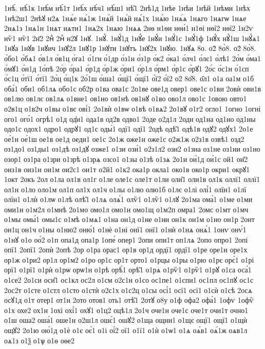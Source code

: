 {1нѣ́.
нѣ́1к
1нѣ́м
нѣ́1т
1нѣ́х
нѣ́ч1
нѣ́ш1
нѣ̑1
2нѣ1д
1нѣе
1нѣи
1нѣй
1нѣми
1нѣх
1нѣ2ш1
2нѣꙋ
н2ѧ
1нѧ́е
нѧ́1ж
1нѧ́й
1нѧ́й
нѧ́1х
1нѧ́ю
1нѧ́ѧ
1нѧго
1нѧгѡ
1нѧе
2нѧ1з
1нѧ1н
1нѧт
нѧти1
1нѧ2х
1нѧю
1нѧѧ
2нѳ
н1ѳи
нѳи́1
н1ѳі
нѳї2
нѳї2
1н2ѵ
нѷ1
нѷ1
2н҃2
2нⷣ
2нⷴ
н2ꙋ
1нꙋ.
1нꙋ́.
1нꙋ́1д
1нꙋ́е
1нꙋ́и
1нꙋ́1с
1нꙋ́1ф
1нꙋ́х
нꙋ́1ш
1нꙋ́ѧ1
1нꙋа
1нꙋв
1нꙋич
1нꙋ2л
1нꙋ1р
1нꙋти
1нꙋтъ
1нꙋ2х
1нꙋю.
1нꙋѧ
8о.
о2̀
8о̀8.
о2́
8о́8.
о́бо1
о́бѧ1
о́в1л
о́в1ц
о́га1
о́1гн
о́1др
о́з1н
о́з1р
о́к2
о́ка1
о́лч1
о́лє1
о́лѣ1
2о́м
о́ма1
о́мꙋ1
о́н1д
1о́пѣ
2о́р
о́ра1
о́р1д
о́р1ж
о́ри1
о́р1л
о́рм1
о́р1с
о́рꙋ1
2о́с
о́с1н
о́1сп
о́с1ц
о́тї1
о́тї1
2о́ц
о́ц1к
2о́1ш
о́ша1
о́щї1
о́щї1
о́ї2
о́ї2
о2̑
8о̑8.
о̑л1
о1а
оа1м
о1б
оба́1
оби1
об1лѧ
обо1с
об2р
о1ва
ова1с
2о1ве
ове1д
овер1
ове1с
о1ви
2овѝ
ови1в
ов1лю
ов1лє
ов1лѧ
о1вне1
ов1но
ов1нѣ
ов1нꙋ
о1во
ово1л
ово1с
1овою
овто1
о2в1ц
о1в2ч
о1вы
о1вє
ові́1
2о1вѝ
о1вѡ
о1вѣ
о1вѧ2
2о1вꙋ
о1г2
огло1
1огно
1огні
ого1
ого́1
огрѣ1
о1д
од̾и1
ода1в
од2в
одво1
2оде
о2д1л
2одн
од1на
од1но
од1ны
одо1с
одох1
одро1
одрꙋ1
од1с
оды́1
одї1
одї1
2одѣ
одѣ̑1
одѣ1в
одꙋ2
одꙋх1
2о1е
ое́1н
ое́1ш
ое1в
ое1д
оеди1
ое1с
2о1ж
оже1н
оже1с
о2ж1ж
о2з1в
озвѣ1
озд2
оз1до1
оз1ды1
оз1дѣ
оз1дꙋ
озже1
о1зи
ози́1
о2з1л2
озн2
о1зна
оз1не
оз1ни
оз1но
озор1
оз1ра
о1зри
о1зрѣ
о1зрѧ
озсо1
о1зы
о1зѣ
о1зѧ
2о1и
ои́1д
ои́1с
ой1
ои̑2
оиз1в
оиз1н
ои1м
ои2с1
ои1т
о2й1
о1к2
ока1р
окла1
око1в
око1р
окри1
окрꙋ1
1окт
2окъ
2ол
о1ла
ол1в
ол1г
о1ле
оле1с
оле1т
о1ли
оли̑1
оли1в
ол1к
оллї1
оллї1
ол1н
о1ло
оло1м
ол1п
ол1х
ол1ч
о1лы
о1лю
олю1б
о1лє
о1лі
олі́1
олїн1
о1лї
олїн1
о1лѝ
о1лѡ
о1лѣ
олѣ̑1
о1лѧ
олѧ́1
олѷ1
о1лѷ1
о1лꙋ
2о1ма
ома́1
о1ме
о1ми
оми1н
о1м2л
о1мнѣ
2о1мо
омо1л
омо1н
омо1щ
о1м2п
омра1
2омс
о1мт
о1мч
о1мы
омы́1
омы1с
о1мѣ
о1мѧ1
о1на
он1д
о1не
о1ни
он1к
он1м
о1но
он1р
2онт
он1ц
он1ч
о1ны
о1ню2
оню́1
о1нѐ
о1ні
онї1
онї1
о1нѝ
о1нѧ
онѧ́1
1онѵ
онѵ́1
о1нꙋ
о1о
оо́2
о1п
опа1д
опа1р
1опе́
опер1
2опи
опи1т
оп1лѧ
2опо
опро1
2опі
опї1
2опї1
2опѝ
2опѣ
2ор
о1ра
орас1
ор1в
ор1д
ордї1
ордї1
о1ре
оре1н
оре1х
ор1ж
о1ри2
ор1л
ор1м2
о1ро
ор1с
ор1т
орто1
о1рцы
о1ры
о1рю
о1рє
орє́1
о1рі
орї1
о1рї1
о1рѝ
о1рѡ
орѡ1н
о1рѣ
орѣ́1
орѣ̑1
о1рѧ
о1рѷ1
о1рѷ1
о1рꙋ
о1са
оса́1
о1се2
2о1си
оси̑1
ос1кл
ос2л
о1см
о2с1н
о1со
ос1пе1
о1спи1
ос1пл
ос1пꙋ
ос1с
2ос2т
о1сте
о1стл
о1сто
о1стѝ
о2с1х
о1с2ц
о1сы
осі́1
осї1
осї1
о1сѝ
о1сѣ
2осѧ
осꙋ1д
о1т
отер1
от1н
2ото
отов1
оть1
отѣ̑1
2отꙋ
о8у
о1ф
офа2
офа́1
1офѵ
1офѷ
о1х
охе2
ох1н
1охі
охі́1
охꙋ1
о1ц2
оцѣ1л
2о1ч
оче1н
оче1с
оче1т
очи1т
очно1
о1ш
оша2
оша́1
оше1н
о2ш1л
ошє́1
ошꙋ2
о1ща
ощни1
о1щє
ощї1
ощї1
о1щѝ
ощꙋ2
2о1ю
ою́1д
о1ѐ
о1є
оє́1
о1і
оі́2
ої1
о1ї1
о1ѝ
о1ѡ1
о1ѧ
оѧ́в1
оѧ́1ж
оѧв1л
оѧ1з
о1ѯ
о1ѱ
о1ѳ
оѳе2
}

